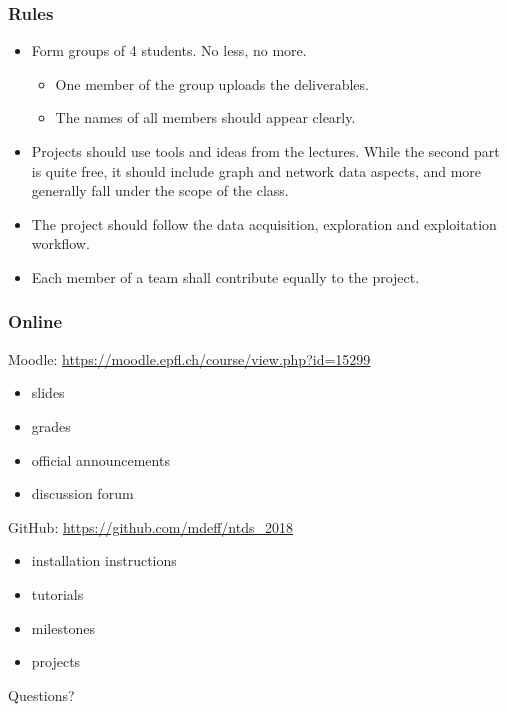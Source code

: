 \documentclass[aspectratio=169]{beamer}
\begin{document}
\begin{frame}
	\frametitle{Rules}
	\begin{itemize}
		\item Form groups of 4 students. No less, no more.
			\begin{itemize}
				\item One member of the group uploads the deliverables.
				\item The names of all members should appear clearly.
			\end{itemize}
		\vfill
		\item Projects should use tools and ideas from the lectures. While the second part is quite free, it should include graph and network data aspects, and more generally fall under the scope of the class.
		\vfill
		\item The project should follow the data acquisition, exploration and exploitation workflow.
		\vfill
		\item Each member of a team shall contribute equally to the project.
	\end{itemize}
\end{frame}


\begin{frame}
	\frametitle{Online}
	Moodle: \url{https://moodle.epfl.ch/course/view.php?id=15299}
	\begin{itemize}
		\item slides
		\item grades
		\item official announcements
		\item discussion forum
	\end{itemize}
	\vspace{1em}
	GitHub: \url{https://github.com/mdeff/ntds_2018}
	\begin{itemize}
		\item installation instructions
		\item tutorials
		\item milestones
		\item projects
	\end{itemize}
	\vfill
	\begin{center}
		\Huge Questions?
	\end{center}
\end{frame}

\end{document}
